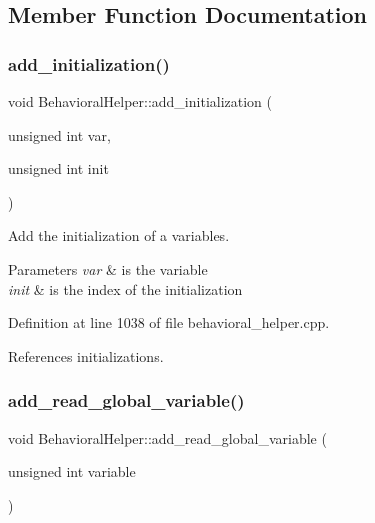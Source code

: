 \subsection{Member Function Documentation}
\mbox{\label{classBehavioralHelper_a737aa57d194070c6bac90beff6e299e6}} 
\subsubsection{\texorpdfstring{add\+\_\+initialization()}{add\_initialization()}}
{\footnotesize\ttfamily void Behavioral\+Helper\+::add\+\_\+initialization (\begin{DoxyParamCaption}\item[{unsigned int}]{var,  }\item[{unsigned int}]{init }\end{DoxyParamCaption})}



Add the initialization of a variables. 


\begin{DoxyParams}{Parameters}
{\em var} & is the variable \\
\hline
{\em init} & is the index of the initialization \\
\hline
\end{DoxyParams}


Definition at line 1038 of file behavioral\+\_\+helper.\+cpp.



References initializations.

\mbox{\label{classBehavioralHelper_a5baec628b0fbeaf1372ad2b2297f5e78}} 
\subsubsection{\texorpdfstring{add\+\_\+read\+\_\+global\+\_\+variable()}{add\_read\_global\_variable()}}
{\footnotesize\ttfamily void Behavioral\+Helper\+::add\+\_\+read\+\_\+global\+\_\+variable (\begin{DoxyParamCaption}\item[{unsigned int}]{variable }\end{DoxyParamCaption})}



